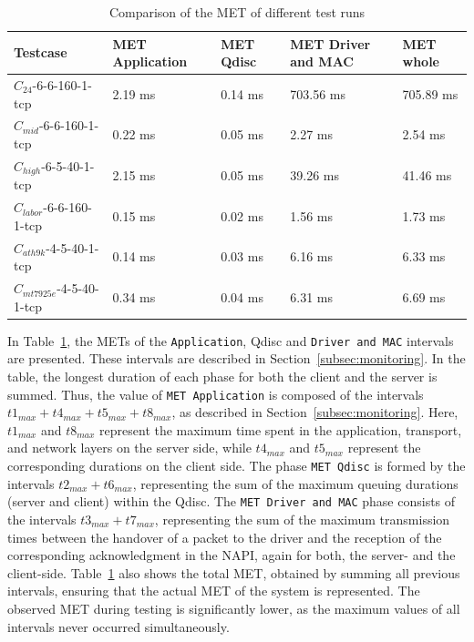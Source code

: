 \begin{table}
\begin{tabular}{||p{3.5cm}|p{2.5cm}|p{2.5cm}|p{2.5cm}|p{2.5cm}||}
\hline\hline
\textbf{Testcase} & \textbf{\ac{MET} \newline Application} & \textbf{\ac{MET} \ac{Qdisc}} & \textbf{\ac{MET} Driver and MAC} & \textbf{\ac{MET} whole} \\
\hline\hline
$C_{24}$-6-6-160-1-tcp & 2.19 ms & 0.14 ms & 703.56 ms & 705.89 ms \\
\hline
$C_{mid}$-6-6-160-1-tcp & 0.22 ms & 0.05 ms & 2.27 ms & 2.54 ms \\
\hline
$C_{high}$-6-5-40-1-tcp & 2.15 ms & 0.05 ms & 39.26 ms & 41.46 ms \\
\hline
$C_{labor}$-6-6-160-1-tcp & 0.15 ms & 0.02 ms & 1.56 ms & 1.73 ms \\
\hline
$C_{ath9k}$-4-5-40-1-tcp & 0.14 ms & 0.03 ms & 6.16 ms & 6.33 ms  \\
\hline
$C_{mt7925e}$-4-5-40-1-tcp & 0.34 ms & 0.04 ms & 6.31 ms & 6.69 ms  \\
\hline\hline
\end{tabular}
\caption{Comparison of the MET of different test runs}
\label{tab:wcet}
\end{table}

In Table~\ref{tab:wcet}, the \acp{MET} of the \texttt{Application}, \ac{Qdisc} and \texttt{Driver and \ac{MAC}} intervals are presented.  
These intervals are described in Section~\ref{subsec:monitoring}.  
In the table, the longest duration of each phase for both the client and the server is summed.  
Thus, the value of \texttt{\ac{MET} Application} is composed of the intervals $t1_{max} + t4_{max} + t5_{max} + t8_{max}$, as described in Section~\ref{subsec:monitoring}.  
Here, $t1_{max}$ and $t8_{max}$ represent the maximum time spent in the application, transport, and network layers on the server side, while $t4_{max}$ and $t5_{max}$ represent the corresponding durations on the client side.  
The phase \texttt{\ac{MET} \ac{Qdisc}} is formed by the intervals $t2_{max} + t6_{max}$, representing the sum of the maximum queuing durations (server and client) within the \ac{Qdisc}.  
The \texttt{\ac{MET} Driver and MAC} phase consists of the intervals $t3_{max} + t7_{max}$, representing the sum of the maximum transmission times between the handover of a packet to the driver and the reception of the corresponding acknowledgment in the NAPI, again for both, the server- and the client-side.  
Table~\ref{tab:wcet} also shows the total \ac{MET}, obtained by summing all previous intervals, ensuring that the actual \ac{MET} of the system is represented.  
The observed \ac{MET} during testing is significantly lower, as the maximum values of all intervals never occurred simultaneously.  

